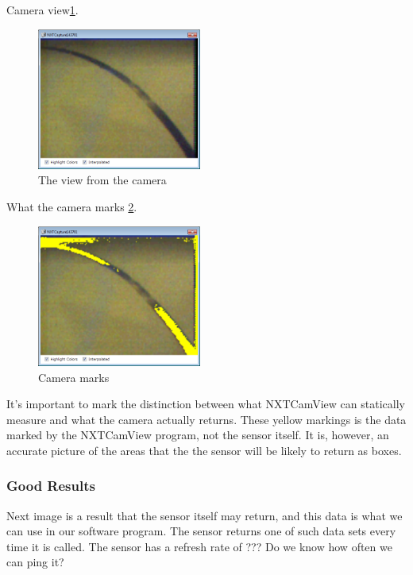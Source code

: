 Camera view\ref{fig:CammeraView}.
\begin{figure}[H]
    \centering
    \includegraphics[width=0.48\textwidth]{Images/Analysis/NXTCamTesting/NXTCamView_Picture_NoHighlight.png}
    \caption{The view from the camera}
    \label{fig:CammeraView}
\end{figure}


What the camera marks \ref{fig:CammeraMarking}.
\begin{figure}[H]
    \centering
    \includegraphics[width=0.48\textwidth]{Images/Analysis/NXTCamTesting/NXTCamView_Picture_Highlight.png}
    \caption{Camera marks}
    \label{fig:CammeraMarking}
\end{figure}

It's important to mark the distinction between what NXTCamView can statically measure and what the camera actually returns. These yellow markings is the data marked by the NXTCamView program, not the sensor itself. It is, however, an accurate picture of the areas that the the sensor will be likely to return as boxes. 

\subsubsection{Good Results}

Next image is a result that the sensor itself may return, and this data is what we can use in our software program. The sensor returns one of such data sets every time it is called. 
The sensor has a refresh rate of ???
Do we know how often we can ping it?

